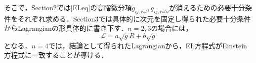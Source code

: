 \documentclass[main]{subfiles}
\begin{document}
そこで，Section2では\eqref{ELeq}の高階微分項\(g_{ij,rst}, g_{ij,rstu} \)が消えるための必要十分条件をそれぞれ求める．Section3では具体的に次元を固定し得られた必要十分条件からLagrangianの形具体的に書き下す．\(n=2,3\)の場合には，
\begin{equation*}
    \mathscr{L} = a\sqrt{g}R + b \sqrt{g}
    \tag{3.1} \label{n=2,3}
\end{equation*}
となる．\(n=4\)では，結論として得られたLagrangianから，EL方程式がEinstein方程式に一致することが導ける．
\end{document}
